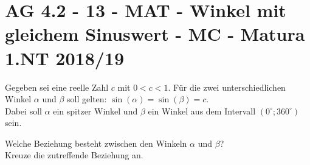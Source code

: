 \section{AG 4.2 - 13 - MAT - Winkel mit gleichem Sinuswert - MC - Matura 1.NT 2018/19}

\begin{beispiel}[AG 4.2]{1}
Gegeben sei eine reelle Zahl $c$ mit $0<c<1$. Für die zwei unterschiedlichen Winkel $\alpha$ und $\beta$ soll gelten: $\sin(\alpha)=\sin(\beta)=c$.\\
Dabei soll $\alpha$ ein spitzer Winkel und $\beta$ ein Winkel aus dem Intervall $(0^\circ; 360^\circ)$ sein.

Welche Beziehung besteht zwischen den Winkeln $\alpha$ und $\beta$?\\
Kreuze die zutreffende Beziehung an.

\end{beispiel}